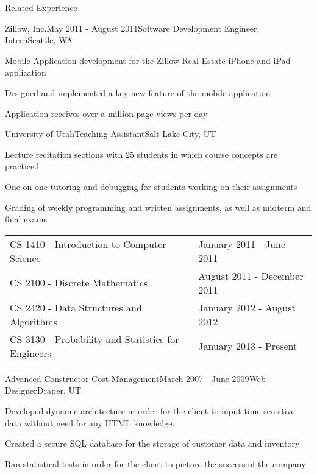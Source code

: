 \documentclass{resume}
\begin{document}
\begin{rSection}{Related Experience}

\begin{experienceZillow}
\begin{rSubsection}{Zillow, Inc.}{May 2011 - August 2011}{Software Development Engineer, Intern}{Seattle, WA}
\item Mobile Application development for the Zillow Real Estate iPhone and iPad application
\item Designed and implemented a key new feature of the mobile application
\item Application receives over a million page views per day
\end{rSubsection}
\end{experienceZillow}


\begin{experienceTA}
\begin{rSubsection}{University of Utah}{}{Teaching Assistant}{Salt Lake City, UT}
\item Lecture recitation sections with 25 students in which course concepts are practiced
\item One-on-one tutoring and debugging for students working on their assignments
\item Grading of weekly programming and written assignments, as well as midterm and final exams
\\
\begin{tabularx}{\textwidth}{ X l }
CS 1410 - Introduction to Computer Science & January 2011 - June 2011 \\
CS 2100 - Discrete Mathematics & August 2011 - December 2011 \\
CS 2420 - Data Structures and Algorithms &  January 2012 - August 2012 \\
CS 3130 - Probability and Statistics for Engineers & January 2013 - Present \\
\end{tabularx}
\end{rSubsection}
\end{experienceTA}


\begin{experienceACCM}
\begin{rSubsection}{Advanced Constructor Cost Management}{March 2007 - June 2009}{Web Designer}{Draper, UT}
\item Developed dynamic architecture in order for the client to input time sensitive data without need for any HTML knowledge.
\item Created a secure SQL database for the storage of customer data and inventory
\item Ran statistical tests in order for the client to picture the success of the company
\end{rSubsection}
\end{experienceACCM}


\end{rSection}
\end{document}
